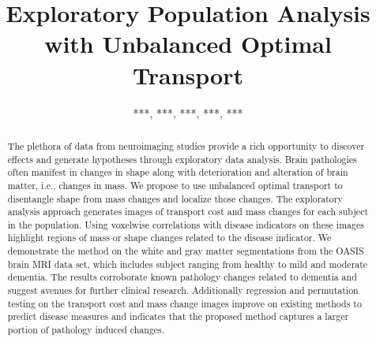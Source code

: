 \documentclass{llncs}
\begin{document}
\title{Exploratory Population Analysis with Unbalanced Optimal Transport}

\author{***, ***, ***, ***, ***}%
\authorrunning{***}%
\institute{***\\%
\email{***@***.**}%
\and
***%
}

\maketitle              




\begin{abstract}
The plethora of data from neuroimaging studies provide a rich opportunity to
discover effects and generate hypotheses through exploratory data analysis.
Brain pathologies often manifest in changes in shape along with deterioration
and alteration of brain matter, i.e., changes in mass. We propose to use
unbalanced optimal transport to disentangle shape from mass changes and
localize those changes. The exploratory analysis approach generates images of
transport cost and mass changes for each subject in the population.  Using
voxelwise correlations with disease indicators on these images highlight
regions of mass or shape changes related to the disease indicator.  We
demonstrate the method on the white and gray matter segmentations from the
OASIS brain MRI data set, which includes subject ranging from healthy to mild
and moderate dementia. The results corroborate known pathology changes related
to dementia and suggest avenues for further clinical research. Additionally
regression and permutation testing on the transport cost and mass change images
improve on existing methods to predict disease measures and indicates that the
proposed method captures a larger portion of pathology induced changes.
\end{abstract}
\end{document}
